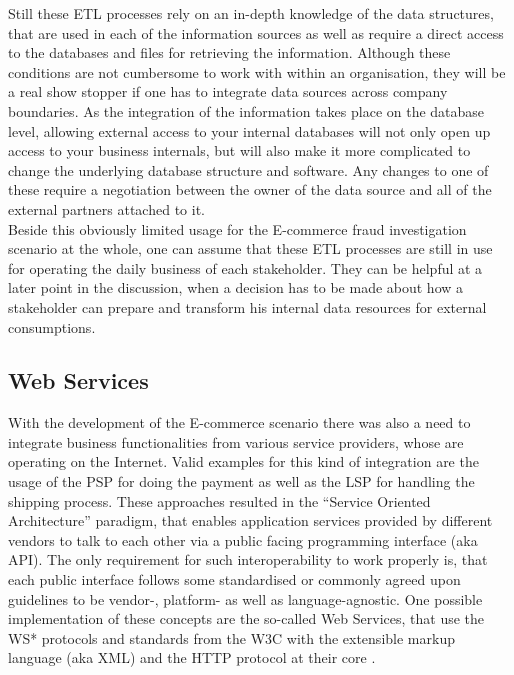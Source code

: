 Still these \gls{ETL} processes rely on an in-depth knowledge of the data structures, that are used in each of the information sources as well as require a direct access to the databases and files for retrieving the information. Although these conditions are not cumbersome to work with within an organisation, they will be a real show stopper if one has to integrate data sources across company boundaries. As the integration of the information takes place on the database level, allowing external access to your internal databases will not only open up access to your business internals, but will also make it more complicated to change the underlying database structure and software. Any changes to one of these require a negotiation between the owner of the data source and all of the external partners attached to it. \\

Beside this obviously limited usage for the \gls{E-commerce} fraud investigation scenario at the whole, one can assume that these \gls{ETL} processes are still in use for operating the daily business of each stakeholder. They can be helpful at a later point in the discussion, when a decision has to be made about how a stakeholder can prepare and transform his internal data resources for external consumptions.


\subsection{Web Services}
\label{subsec:web_services}

With the development of the \gls{E-commerce} scenario there was also a need to integrate business functionalities from various service providers, whose are operating on the Internet. Valid examples for this kind of integration are the usage of the \gls{PSP} for doing the payment as well as the \gls{LSP} for handling the shipping process. These approaches resulted in the ``Service Oriented Architecture'' paradigm, that enables application services provided by different vendors to talk to each other via a public facing programming interface (aka \gls{API}). The only requirement for such interoperability to work properly is, that each public interface follows some standardised or commonly agreed upon guidelines to be vendor-, platform- as well as language-agnostic. One possible implementation of these concepts are the so-called Web Services, that use the WS* protocols and standards from the \gls{W3C} with the extensible markup language (aka \gls{XML}) and the \gls{HTTP} protocol at their core \citep{josuttis2007soa}. \\

